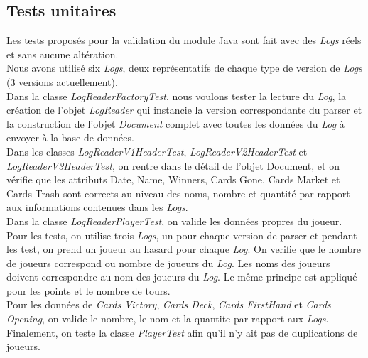 \subsection{Tests unitaires}

Les tests proposés pour la validation du module Java sont fait avec des \textit{Logs} réels et sans aucune altération.\\
Nous avons utilisé six \textit{Logs}, deux représentatifs de chaque type de version de \textit{Logs} (3 versions actuellement). \\

Dans la classe \textit{LogReaderFactoryTest}, nous voulons tester la lecture du \textit{Log}, la création de l'objet \textit{LogReader} qui instancie la version correspondante du parser et la construction de l'objet \textit{Document} complet avec toutes les données du \textit{Log} à envoyer à la base de données. \\

Dans les classes \textit{LogReaderV1HeaderTest}, \textit{LogReaderV2HeaderTest }et \textit{LogReaderV3HeaderTest}, on rentre dans le détail de l'objet Document, et on vérifie que les attributs Date, Name, Winners, Cards Gone, Cards Market et Cards Trash sont corrects au niveau des noms, nombre et quantité par rapport aux informations contenues dans les \textit{Logs}. \\

Dans la classe \textit{LogReaderPlayerTest}, on valide les données propres du joueur. Pour les tests, on utilise trois \textit{Logs}, un pour chaque version de parser et pendant les test, on prend un joueur au hasard pour chaque \textit{Log}. On verifie que le nombre de joueurs correspond ou nombre de joueurs du \textit{Log}. Les noms des joueurs doivent correspondre au nom des joueurs du \textit{Log}. Le même principe est appliqué pour les points et le nombre de tours. \\
Pour les données de \textit{Cards Victory}, \textit{Cards Deck}, \textit{Cards FirstHand} et \textit{Cards Opening}, on valide le nombre, le nom et la quantite par rapport aux \textit{Logs}. \\

Finalement, on teste la classe \textit{PlayerTest} afin qu'il n'y ait pas de duplications de joueurs.

